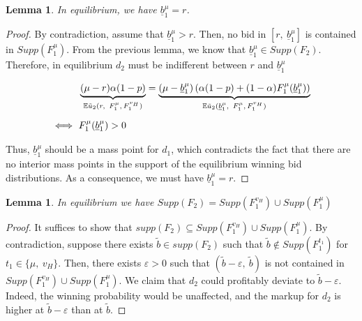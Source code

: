 \documentclass[11pt]{article}
\theoremstyle{plain}
\theoremstyle{definition}
\theoremstyle{plain}
\theoremstyle{plain}
\theoremstyle{plain}
\newtheorem{lem}[thm]{Lemma}
\theoremstyle{plain}
\numberwithin{equation}{section}
\begin{document}
\vspace{4mm}

\begin{lem}\label{lem:lowest}
In equilibrium, we have $ \underline{b}_1^{\mu} = r $.
\end{lem}

\begin{proof}
By contradiction, assume that $ \underline{b}_1^{\mu} > r $. Then, no bid in $ \left[r,\ \underline{b}_1^{\mu}\right] $ is contained in $ Supp\left(F_1^{\mu}\right) $. From the previous lemma, we know that $ \underline{b}_1^{\mu} \in Supp(F_2) $. Therefore, in equilibrium $ d_2 $ must be indifferent between $ r $ and $ \underline{b}_1^{\mu} $

\begin{align*}
&\underbrace{(\mu - r)\alpha(1-p)}_\text{$ \mathbb{E}\tilde{u}_2(r,\ F_1^{\mu}, F_1^{v_H})$} = \underbrace{(\mu - \underline{b}_1^{\mu})\left(\alpha(1 - p) + (1 - \alpha) F_1^{\mu}(\underline{b}_1^{\mu}) \right)}_\text{$ \mathbb{E}\tilde{u}_2(\underline{b}_1^{\mu},\ F_1^{\mu}, F_1^{v_H})$}\\[5pt]
\iff \ &F_1^{\mu}(\underline{b}_1^{\mu}) > 0
\end{align*}

\noindent Thus, $ \underline{b}_1^{\mu} $ should be a mass point for $ d_1 $, which contradicts the fact that there are no interior mass points in the support of the equilibrium winning bid distributions. As a consequence, we must have $ \underline{b}_1^{\mu} = r $. 
\end{proof}

\vspace{0.4cm}

\begin{lem}\label{lem:union}
In equilibrium we have $ Supp(F_2) = Supp\left(F_1^{v_H}\right) \cup Supp\left(F_1^{\mu}\right) $
\end{lem}

\begin{proof}
It suffices to show that $ supp(F_2) \subseteq Supp\left(F_1^{v_H}\right) \cup Supp\left(F_1^{\mu}\right) $. By contradiction, suppose there exists $ \tilde{b} \in supp(F_2) $ such that $ \tilde{b} \notin Supp\left(F_1^{t_1}\right) $ for $ t_1 \in \{ \mu,\ v_H \} $. Then, there exists $ \varepsilon > 0 $ such that $ (\tilde{b} - \varepsilon,\ \tilde{b}) $ is not contained in $ Supp\left(F_1^{v_H}\right) \cup Supp\left(F_1^{\mu}\right) $. We claim that $ d_2 $ could profitably deviate to $ \tilde{b} - \varepsilon $. Indeed, the winning probability would be unaffected, and the markup for $ d_2 $ is higher at $ \tilde{b} - \varepsilon $ than at $ \tilde{b} $.
\end{proof}
\end{document}
